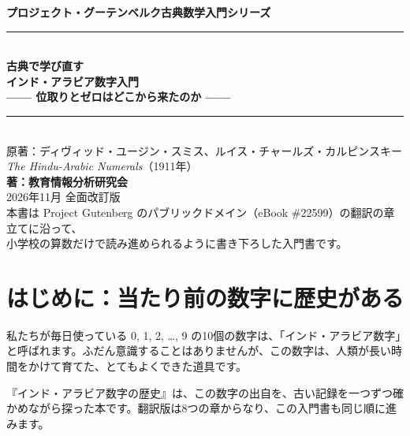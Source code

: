 \documentclass[a4paper,11pt,openany]{ltjsbook}
\begin{document}
\begin{titlepage}
\begin{center}
\vspace*{1.5cm}
{\Large\bfseries プロジェクト・グーテンベルク古典数学入門シリーズ}\\[0.8cm]
\rule{\textwidth}{1.5pt}\\[0.4cm]
{\Huge\bfseries 古典で学び直す\\インド・アラビア数字入門}\\[0.4cm]
{\Large\bfseries —— 位取りとゼロはどこから来たのか ——}\\[0.4cm]
\rule{\textwidth}{1.5pt}\\[1.5cm]
{\large 原著：ディヴィッド・ユージン・スミス、ルイス・チャールズ・カルピンスキー\\
\textit{The Hindu-Arabic Numerals}（1911年）}\\[2.0cm]
{\Large\bfseries 著：教育情報分析研究会}\\[2.5cm]
\vfill
{\large 2026年11月 全面改訂版}\\[0.5cm]
{\footnotesize 本書は Project Gutenberg のパブリックドメイン（eBook \#22599）の翻訳の章立てに沿って、\\
小学校の算数だけで読み進められるように書き下ろした入門書です。}
\end{center}
\end{titlepage}

\frontmatter
\tableofcontents
\mainmatter

\chapter*{はじめに：当たり前の数字に歴史がある}

私たちが毎日使っている 0, 1, 2, …, 9 の10個の数字は、「インド・アラビア数字」と呼ばれます。ふだん意識することはありませんが、この数字は、人類が長い時間をかけて育てた、とてもよくできた道具です。

『インド・アラビア数字の歴史』は、この数字の出自を、古い記録を一つずつ確かめながら探った本です。翻訳版は8つの章からなり、この入門書も同じ順に進みます。
\end{document}

